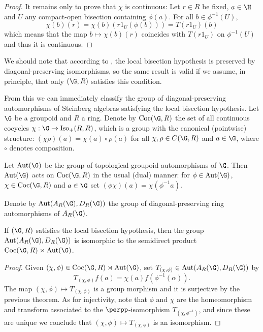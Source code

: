 \begin{proof}
It remains only to prove that $\chi$ is continuous: Let $r\in R$ be fixed, $a\in\H$ and $U$ any compact-open bisection containing $\phi(a)$. For all $b\in\phi^{-1}(U)$,
\[\chi(b)(r)=\chi(b)(r1_U(\phi(b)))=T(r1_U)(b)\]
which means that the map $b\mapsto\chi(b)(r)$ coincides with $T(r1_U)$ on $\phi^{-1}(U)$ and thus it is continuous.\qedhere
\end{proof}

We should note that according to \cite{arxiv1711.01903v2}, the local bisection hypothesis is preserved by diagonal-preserving isomorphisms, so the same result is valid if we assume, in principle, that only $(\G,R)$ satisfies this condition.

From this we can immediately classify the group of diagonal-preserving automorphisms of Steinberg algebras satisfying the local bisection hypothesis. Let $\G$ be a groupoid and $R$ a ring. Denote by $\operatorname{Coc}(\G,R)$ the set of all continuous cocycles $\chi:\G\to\operatorname{Iso}_+(R,R)$, which is a group with the canonical (pointwise) structure: $(\chi\rho)(a)=\chi(a)\circ\rho(a)$ for all $\chi,\rho\in C(\G,R)$ and $a\in\G$, where $\circ$ denotes composition.

Let $\operatorname{Aut}(\G)$ be the group of topological groupoid automorphisms of $\G$. Then $\operatorname{Aut}(\G)$ acts on $\operatorname{Coc}(\G,R)$ in the usual (dual) manner: for $\phi\in\operatorname{Aut}(\G)$, $\chi\in\operatorname{Coc}(\G,R)$ and $a\in\G$ set $(\phi\chi)(a)=\chi(\phi^{-1}a)$.

Denote by $\operatorname{Aut}(A_R(\G),D_R(\G))$ the group of diagonal-preserving ring automorphisms of $A_R(\G)$.

\begin{corollary}\label{corollaryclassificationofautomorphismsofsteinbergalgebras}
If $(\G,R)$ satisfies the local bisection hypothesis, then the group $\operatorname{Aut}(A_R(\G),D_R(\G))$ is isomorphic to the semidirect product $\operatorname{Coc}(\G,R)\rtimes\operatorname{Aut}(\G)$.
\end{corollary}
\begin{proof}
Given $(\chi,\phi)\in\operatorname{Coc}(\G,R)\rtimes\operatorname{Aut}(\G)$, set $T_{(\chi,\phi)}\in\operatorname{Aut}(A_R(\G),D_R(\G))$ by \[T_{(\chi,\phi)}f(a)=\chi(a)f(\phi^{-1}(\alpha)).\]
The map $(\chi,\phi)\mapsto T_{(\chi,\phi)}$ is a group morphism and it is surjective by the previous theorem. As for injectivity, note that $\phi$ and $\chi$ are the homeomorphism and transform associated to the $\perpp$-isomorphism $T_{(\chi,\phi^{-1})}$, and since these are unique we conclude that $(\chi,\phi)\mapsto T_{(\chi,\phi)}$ is an isomorphism.\qedhere
\end{proof}


